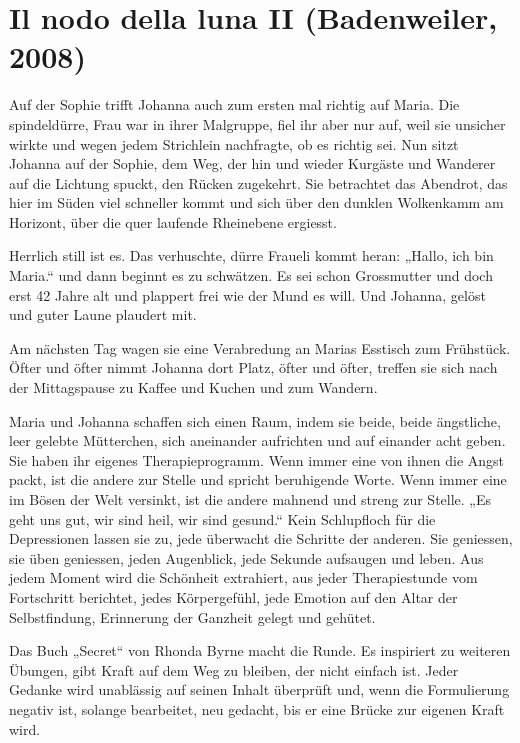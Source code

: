 \documentclass[10pt,titlepage,a5paper]{book}
\begin{document}
\section*{Il nodo della luna II (Badenweiler, 2008)}



Auf der Sophie trifft Johanna auch zum ersten mal richtig auf Maria. Die spindeldürre, Frau war in ihrer Malgruppe, fiel ihr aber nur auf, weil sie unsicher wirkte und wegen jedem Strichlein nachfragte, ob es richtig sei. Nun sitzt Johanna auf der Sophie, dem Weg, der hin und wieder Kurgäste und Wanderer auf die Lichtung spuckt, den Rücken zugekehrt. Sie betrachtet das Abendrot, das hier im Süden viel schneller kommt und sich über den dunklen Wolkenkamm am Horizont, über die quer laufende Rheinebene ergiesst.

 Herrlich still ist es. Das verhuschte, dürre Fraueli kommt heran: „Hallo, ich bin Maria.“ und dann beginnt es zu schwätzen. Es sei schon Grossmutter und doch erst 42 Jahre alt und plappert frei wie der Mund es will. Und Johanna, gelöst und guter Laune plaudert mit. 
 
Am nächsten Tag wagen sie eine Verabredung an Marias Esstisch zum Frühstück. Öfter und öfter nimmt Johanna dort Platz, öfter und öfter, treffen sie sich nach der Mittagspause zu Kaffee und Kuchen und zum Wandern. 

Maria und Johanna schaffen sich einen Raum, indem sie beide, beide  ängstliche, leer gelebte Mütterchen, sich aneinander aufrichten und auf einander acht geben. Sie haben ihr eigenes Therapieprogramm. Wenn immer eine von ihnen die Angst packt, ist die andere zur Stelle und spricht beruhigende Worte. Wenn immer eine im Bösen der Welt versinkt, ist die andere mahnend und streng zur Stelle. „Es geht uns gut, wir sind heil, wir sind gesund.“ Kein Schlupfloch für die Depressionen lassen sie zu, jede überwacht die Schritte der anderen. Sie geniessen, sie üben geniessen, jeden Augenblick, jede Sekunde aufsaugen und leben. Aus jedem Moment wird die Schönheit extrahiert, aus jeder Therapiestunde vom Fortschritt berichtet, jedes Körpergefühl, jede Emotion auf den Altar der Selbstfindung, Erinnerung der Ganzheit gelegt und gehütet.  

Das Buch „Secret“ von Rhonda Byrne macht die Runde. Es inspiriert zu weiteren Übungen, gibt Kraft auf dem Weg zu bleiben, der nicht einfach ist. Jeder Gedanke wird unablässig auf seinen Inhalt überprüft und, wenn die Formulierung negativ ist, solange bearbeitet, neu gedacht, bis er eine Brücke zur eigenen Kraft wird.
\end{document}
